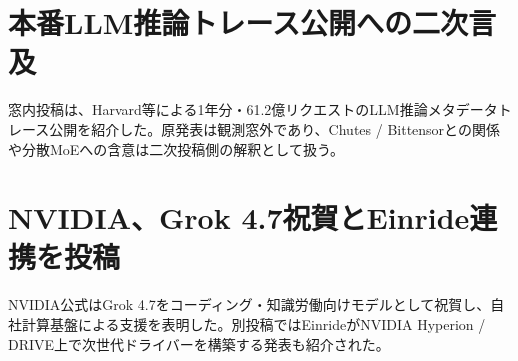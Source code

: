 \section{本番LLM推論トレース公開への二次言及}
窓内投稿は、Harvard等による1年分・61.2億リクエストのLLM推論メタデータトレース公開を紹介した。原発表は観測窓外であり、Chutes / Bittensorとの関係や分散MoEへの含意は二次投稿側の解釈として扱う。

\section{NVIDIA、Grok 4.7祝賀とEinride連携を投稿}
NVIDIA公式はGrok 4.7をコーディング・知識労働向けモデルとして祝賀し、自社計算基盤による支援を表明した。別投稿ではEinrideがNVIDIA Hyperion / DRIVE上で次世代ドライバーを構築する発表も紹介された。
